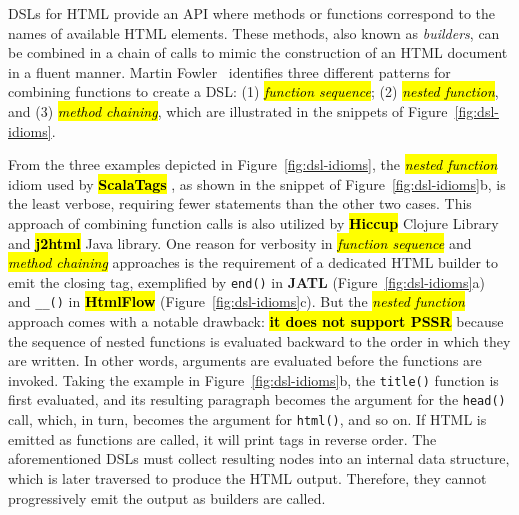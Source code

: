 \documentclass[software,article,accept,pdftex,moreauthors]{Definitions/mdpi}
\begin{document}
DSLs for HTML provide an API where methods or functions correspond to the names
of available HTML elements. These methods, also known as \textit{builders}, can
be combined in a chain of calls to mimic the construction of an HTML document
in a fluent manner. Martin Fowler~\cite{dslbook} identifies three different
patterns for combining functions to create a DSL: (1) \textit{\hl{function
  sequence}}; (2) \textit{\hl{nested function}}, and (3) \textit{\hl{method chaining}}, which
are illustrated in the snippets of Figure~\ref{fig:dsl-idioms}.

From the three examples depicted in Figure~\ref{fig:dsl-idioms}, the
\textit{\hl{nested function}} idiom used by \textbf{\hl{ScalaTags}%
}, as shown in the
snippet of Figure~\ref{fig:dsl-idioms}b, is the least verbose, requiring
fewer statements than the other two cases. This approach of combining function
calls is also utilized by \textbf{\hl{Hiccup}} Clojure Library and \textbf{\hl{j2html}}
Java library. One reason for verbosity in \textit{\hl{function sequence}} and
\textit{\hl{method chaining}} approaches is the requirement of a dedicated HTML
builder to emit the closing tag, exemplified by \texttt{end()} in \textbf{JATL}
(Figure~\ref{fig:dsl-idioms}a) and \texttt{\_\_()} in \textbf{\hl{HtmlFlow}}
(Figure~\ref{fig:dsl-idioms}c). But the \textit{\hl{nested function}} approach
comes with a notable drawback: \textbf{\hl{it does not support PSSR}} because the
sequence of nested functions is evaluated backward to the order in which they
are written. In other words, arguments are evaluated before the functions are
invoked. Taking the example in Figure~\ref{fig:dsl-idioms}b, the
\texttt{title()} function is first evaluated, and its resulting paragraph
becomes the argument for the \texttt{head()} call, which, in turn, becomes the
argument for \texttt{html()}, and so on. If HTML is emitted as functions are
called, it will print tags in reverse order. The aforementioned DSLs must
collect resulting nodes into an internal data structure, which is later
traversed to produce the HTML output. Therefore, they cannot progressively emit
the output as builders are called.
\end{document}
